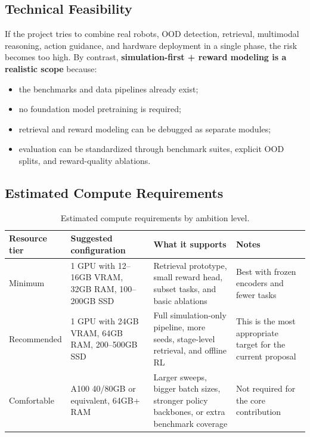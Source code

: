 \subsection{Technical Feasibility}

If the project tries to combine real robots, OOD detection, retrieval, multimodal reasoning,
action guidance, and hardware deployment in a single phase, the risk becomes too high.
By contrast, \textbf{simulation-first + reward modeling is a realistic scope} because:
\begin{itemize}
  \item the benchmarks and data pipelines already exist;
  \item no foundation model pretraining is required;
  \item retrieval and reward modeling can be debugged as separate modules;
  \item evaluation can be standardized through benchmark suites, explicit OOD splits, and reward-quality ablations.
\end{itemize}

\subsection{Estimated Compute Requirements}

\begin{table}[htbp]
  \centering
  \small
  \begin{tabularx}{\textwidth}{p{2.8cm}p{2.8cm}Y Y}
    \toprule
    Resource tier & Suggested configuration & What it supports & Notes \\
    \midrule
    Minimum & 1 GPU with 12--16GB VRAM, 32GB RAM, 100--200GB SSD & Retrieval prototype, small reward head, subset tasks, and basic ablations & Best with frozen encoders and fewer tasks \\
    Recommended & 1 GPU with 24GB VRAM, 64GB RAM, 200--500GB SSD & Full simulation-only pipeline, more seeds, stage-level retrieval, and offline RL & This is the most appropriate target for the current proposal \\
    Comfortable & A100 40/80GB or equivalent, 64GB+ RAM & Larger sweeps, bigger batch sizes, stronger policy backbones, or extra benchmark coverage & Not required for the core contribution \\
    \bottomrule
  \end{tabularx}
  \caption{Estimated compute requirements by ambition level.}
\end{table}

